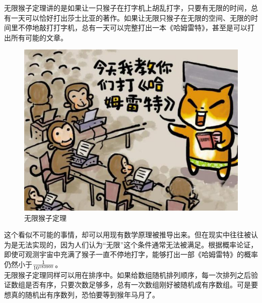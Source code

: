 无限猴子定理讲的是如果让一只猴子在打字机上胡乱打字，只要有无限的时间，总有一天可以恰好打出莎士比亚的著作。如果让无限只猴子在无限的空间、无限的时间里不停地敲打打字机，总有一天可以完整打出一本《哈姆雷特》，甚至是可以打出所有可能的文章。

\begin{figure}[H]
	\centering
	\includegraphics[]{img/C8/8-12/1.png}
	\caption{无限猴子定理}
\end{figure}

这个看似不可能的事情，却可以用现有数学原理被推导出来。但在现实中往往被认为是无法实现的，因为人们认为“无限”这个条件通常无法被满足。根据概率论证，即使可观测宇宙中充满了猴子一直不停地打字，能够打出一部《哈姆雷特》的概率仍然小于$ 1 \over 10^{183900} $。\\

无限猴子定理同样可以用在排序中。如果给数组随机排列顺序，每一次排列之后验证数组是否有序，只要次数足够多，总有一次数组刚好被随机成有序数组。可是要想真的随机出有序数列，恐怕要等到猴年马月了。

\newpage